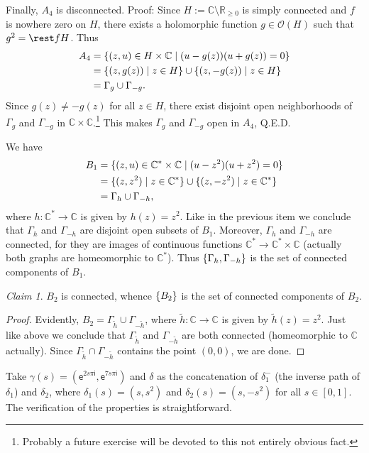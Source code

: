 \documentclass[a4paper]{amsart}
\newcommand{\C}{\mathbb{C}}
\newcommand{\R}{\mathbb{R}}
\newcommand{\ee}[1]{\mathsf{e}^{#1}}
\newcommand{\ii}{\mathsf{i}}
\renewcommand{\O}{\mathcal{O}}
\theoremstyle{remark}
\newtheorem{claim}{Claim}[question]
\numberwithin{equation}{question}
\DeclarePairedDelimiter\set{\{}{\}}
\begin{document}
\begin{solution}
\begin{solenum}
Finally, $A_4$ is disconnected. Proof: Since $H := \C \setminus \R_{\ge0}$ is simply connected and $f$ is nowhere zero on $H$, there exists a holomorphic function $g \in \O(H)$ such that $g^2 = \rest fH$. Thus
\begin{align*}
A_4 &= \set{(z,u) \in H \times \C \mid (u - g(z))(u + g(z)) = 0} \\
&= \set{(z,g(z)) \mid z \in H} \cup \set{(z,-g(z)) \mid z \in H} \\
&= \Gamma_g \cup \Gamma_{-g}.
\end{align*}
Since $g(z) \ne -g(z)$ for all $z \in H$, there exist disjoint open neighborhoods of $\Gamma_g$ and $\Gamma_{-g}$ in $\C \times \C$.\footnote{Probably a future exercise will be devoted to this not entirely obvious fact.} This makes $\Gamma_g$ and $\Gamma_{-g}$ open in $A_4$, Q.E.D.

\item We have
\begin{align*}
B_1 &= \set{(z,u) \in \C^* \times \C \mid (u - z^2)(u + z^2) = 0} \\
&= \set{(z,z^2) \mid z \in \C^*} \cup \set{(z,-z^2) \mid z \in \C^*} \\
&= \Gamma_h \cup \Gamma_{-h},
\end{align*}
where $h \colon \C^* \to \C$ is given by $h(z) = z^2$. Like in the previous item we conclude that $\Gamma_h$ and $\Gamma_{-h}$ are disjoint open subsets of $B_1$. Moreover, $\Gamma_h$ and $\Gamma_{-h}$ are connected, for they are images of continuous functions $\C^* \to \C^* \times \C$ (actually both graphs are homeomorphic to $\C^*$). Thus $\set{\Gamma_h,\Gamma_{-h}}$ is the set of connected components of $B_1$.

\begin{claim}
$B_2$ is connected, whence $\set{B_2}$ is the set of connected components of $B_2$.
\end{claim}
\begin{proof}
Evidently, $B_2 = \Gamma_{\tilde h} \cup \Gamma_{-\tilde h}$, where $\tilde h \colon \C \to \C$ is given by $\tilde h(z) = z^2$. Just like above we conclude that $\Gamma_{\tilde h}$ and $\Gamma_{-\tilde h}$ are both connected (homeomorphic to $\C$ actually). Since $\Gamma_{\tilde h} \cap \Gamma_{-\tilde h}$ contains the point $(0,0)$, we are done.
\end{proof}

\item Take $\gamma(s) = (\ee{2s\pi\ii},\ee{7s\pi\ii})$ and $\delta$ as the concatenation of $\delta_1^-$ (the inverse path of $\delta_1$) and $\delta_2$, where $\delta_1(s) = (s,s^2)$ and $\delta_2(s) = (s,-s^2)$ for all $s \in [0,1]$. The verification of the properties is straightforward.


\end{solenum}
\end{solution}
\end{document}
